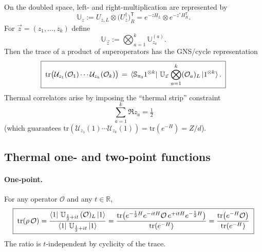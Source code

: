\documentclass{article}
\theoremstyle{definition}
\newcommand{\mO}{\mathcal{O}}
\newcommand{\tr}{\text{tr}}
\begin{document}
    On the doubled space, left- and right-multiplication are represented by
    \begin{equation}
        \mathbb{U}_{z}:=U_{z,L}\otimes \big(U_{z}^{\dagger}\big)_{R}^{\mathsf{T}}
        =e^{-zH_L}\otimes e^{-z^{\ast} H_R^{\mathsf{T}}}.
    \end{equation}
    For $\vec z=(z_{1},\dots,z_{k})$ define
    \begin{equation}
        \mathbb{U}_{\vec z}:=\bigotimes_{a=1}^{k}\mathbb{U}_{z_a}^{(a)}.
    \end{equation}
    Then the trace of a product of superoperators has the GNS/cycle
    representation
    \begin{equation}
        \boxed{\; \tr\big(\mathcal{U}_{z_1}(\mO_1)\cdots \mathcal{U}_{z_k}(\mO_k)\big) \,=\,\bra{\mathbb{S}_{\pi_0}1^{\otimes k}}\,\mathbb{U}_{\vec z}\,\bigotimes_{a=1}^{k}(\mO_a)_{L}\ket{1^{\otimes k}}.\;}
    \end{equation}
    Thermal correlators arise by imposing the ``thermal strip'' constraint
    \begin{equation}
        \boxed{\;\sum_{a=1}^k \Re z_a=\tfrac12\;}
    \end{equation}
    (which guarantees $\tr(\mathcal{U}_{z_1}(1)\cdots \mathcal{U}_{z_k}(1))=\tr (
    e^{-H})=Z/d$).

    \subsection*{Thermal one- and two-point functions}

    \paragraph{One-point.}
    For any operator $\mO$ and any $t\in\mathbb{R}$,
    \begin{equation}
        \label{1ptthermal}\boxed{\; \tr(\rho\,\mO) =\frac{\bra{1}\,\mathbb{U}_{\frac{1}{2}+i t}\,(\mO)_{L}\ket{1}}{\bra{1}\,\mathbb{U}_{\frac{1}{2}+i t}\ket{1}} =\frac{\tr\big(e^{-\frac{1}{2}H}e^{-i tH}\mO\,e^{+i tH}e^{-\frac{1}{2}H}\big)}{\tr(e^{-H})}=\frac{\tr\big(e^{-H}\mO\big)}{\tr(e^{-H})}\;}
    \end{equation}
    The ratio is $t$-independent by cyclicity of the trace.
\end{document}
